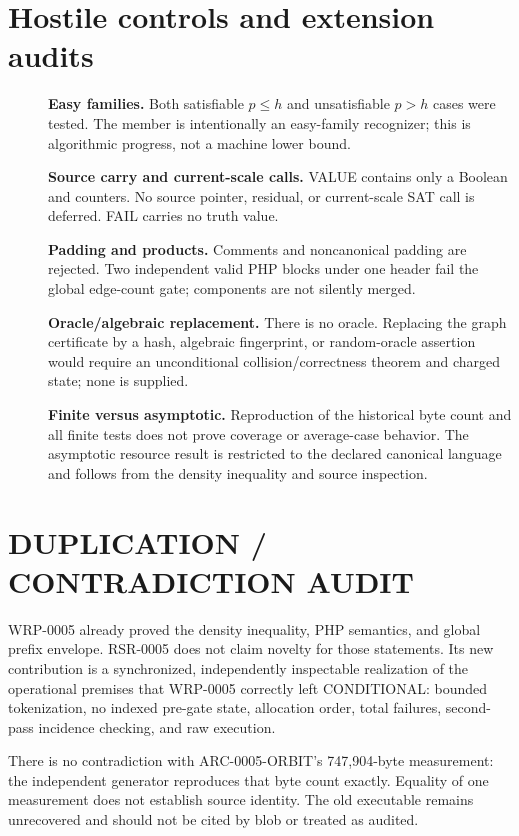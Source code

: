 \documentclass[11pt]{article}
\begin{document}
\section{Hostile controls and extension audits}
\begin{description}
\item[] \textbf{Easy families.} Both satisfiable $p\le h$ and unsatisfiable
$p>h$ cases were tested.  The member is intentionally an easy-family
recognizer; this is algorithmic progress, not a machine lower bound.
\item[] \textbf{Source carry and current-scale calls.} VALUE contains only a
Boolean and counters.  No source pointer, residual, or current-scale SAT call
is deferred.  FAIL carries no truth value.
\item[] \textbf{Padding and products.} Comments and noncanonical padding are
rejected.  Two independent valid PHP blocks under one header fail the global
edge-count gate; components are not silently merged.
\item[] \textbf{Oracle/algebraic replacement.} There is no oracle.  Replacing
the graph certificate by a hash, algebraic fingerprint, or random-oracle
assertion would require an unconditional collision/correctness theorem and
charged state; none is supplied.
\item[] \textbf{Finite versus asymptotic.} Reproduction of the historical byte
count and all finite tests does not prove coverage or average-case behavior.
The asymptotic resource result is restricted to the declared canonical
language and follows from the density inequality and source inspection.
\end{description}

\section{DUPLICATION / CONTRADICTION AUDIT}
WRP-0005 already proved the density inequality, PHP semantics, and global
prefix envelope.  RSR-0005 does not claim novelty for those statements.  Its
new contribution is a synchronized, independently inspectable realization of
the operational premises that WRP-0005 correctly left CONDITIONAL: bounded
tokenization, no indexed pre-gate state, allocation order, total failures,
second-pass incidence checking, and raw execution.

There is no contradiction with ARC-0005-ORBIT's 747,904-byte measurement: the
independent generator reproduces that byte count exactly.  Equality of one
measurement does not establish source identity.  The old executable remains
unrecovered and should not be cited by blob or treated as audited.
\end{document}
